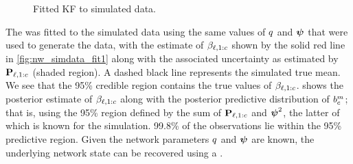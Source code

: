 \begin{knitrout}\small
{}\color{fgcolor}\begin{figure}

{\centering {}\\
\\

}

\caption[Fitted KF to simulated data]{Fitted KF to simulated data.}\label{fig:nw_simdata_fit}
\end{figure}


\end{knitrout}

The \kf{} was fitted to the simulated data using the same values of $q$ and $\mathbf{\boldsymbol{\psi}}$ that were used to generate the data, with the estimate of $\beta_{\ell,1:c}$ shown by the solid red line in \cref{fig:nw_simdata_fit1} along with the associated uncertainty as estimated by $\mathbf{P}_{\ell,1:c}$ (shaded region). A dashed black line represents the simulated true mean. We see that the 95\% credible region contains the true values of $\beta_{\ell,1:c}$.  shows the posterior estimate of $\beta_{\ell,1:c}$ along with the posterior predictive distribution of $b_c^m$; that is, using the 95\% region defined by the sum of $\mathbf{P}_{\ell,1:c}$ and $\mathbf{\boldsymbol{\psi}}^2$, the latter of which is known for the simulation. 99.8\% of the observations lie within the 95\% predictive region. Given the network parameters $q$ and $\mathbf{\boldsymbol{\psi}}$ are known, the underlying network state can be recovered using a \kf{}.


